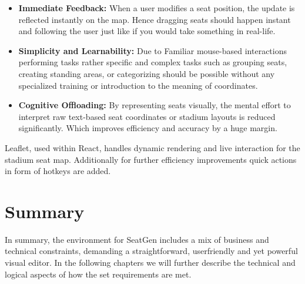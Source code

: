\begin{itemize}
    \item \textbf{Immediate Feedback:} When a user modifies a seat position, the update is reflected instantly on the map. Hence dragging seats should happen instant and following the user just like if you would take something in real-life.
    \item \textbf{Simplicity and Learnability:} Due to Familiar mouse-based interactions performing tasks rather specific and complex tasks such as grouping seats, creating standing areas, or categorizing should be possible without any specialized training or introduction to the meaning of coordinates.
    \item \textbf{Cognitive Offloading:} By representing seats visually, the mental effort to interpret raw text-based seat coordinates or stadium layouts is reduced significantly. Which improves efficiency and accuracy by a huge margin.
\end{itemize}

Leaflet, used within React, handles dynamic rendering and live interaction for the stadium seat map. Additionally for further efficiency improvements quick actions in form of hotkeys are added.

\section{Summary}
In summary, the environment for SeatGen includes a mix of business and technical constraints, demanding a straightforward, userfriendly and yet powerful visual editor. In the following chapters we will further describe the technical and logical aspects of how the set requirements are met.